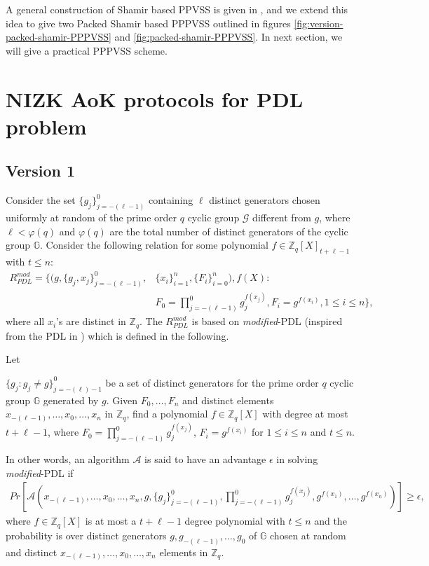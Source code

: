 A general construction of Shamir based PPVSS is given in \cite{cryptoeprint:2025/576}, and we extend this idea 
to give two Packed Shamir based PPPVSS outlined in figures \ref{fig:version-packed-shamir-PPPVSS} and \ref{fig:packed-shamir-PPPVSS}. 
In next section, we will give a practical PPPVSS scheme.




\section{NIZK AoK protocols for PDL problem}
\label{sec:aok_polynomial_dl}
\subsection{Version 1}
Consider the set $\{g_j\}_{j=-(\ell-1)}^0$ containing $\ell$ distinct generators chosen uniformly at random of 
the prime order $q$ cyclic group $\mathcal{G}$ different from $g$, where $\ell<\varphi(q)$ and $\varphi(q)$ are 
the total number of distinct generators of the cyclic group $\mathbb{G}$. Consider the following relation for 
some polynomial $f\in\mathbb{Z}_q[X]_{t+\ell-1}$ with $t\leq n$:
\begin{align}\label{eq:relation_mod_PDL}
  R_{PDL}^{mod} = \{(g,\{g_j,x_j\}_{j=-(\ell-1)}^0,&\{x_i\}_{i=1}^n,\{F_i\}_{i=0}^n),f(X) :\nonumber\\
   &F_0=\prod_{j=-(\ell-1)}^{0}g_j^{f(x_j)}, F_i=g^{f(x_i)}, 1\leq i\leq n\},
\end{align}
where all $x_i$'s are distinct in $\mathbb{Z}_q$. The $R_{PDL}^{mod}$ is based on \textit{modified}-PDL (inspired from the PDL in \cite{cryptoeprint:2023/1669}) 
which is defined in the following.

\begin{definition}
  Let\par 
  $\{g_j : g_j\neq g\}_{j=-(\ell)-1}^0$ be a set of distinct generators for the prime order $q$ cyclic 
  group $\mathbb{G}$ generated by $g$. Given $F_0,\dots,F_n$ and distinct elements $x_{-(\ell-1)},\dots,x_0,\dots,x_n$ in 
  $\mathbb{Z}_q$, find a polynomial $f\in\mathbb{Z}_q[X]$ with degree at most $t+\ell-1$, where $F_0=\prod_{j=-(\ell-1)}^{0}g_j^{f(x_j)}$, 
  $F_i=g^{f(x_i)}$ for $1\leq i\leq n$ and $t\leq n$.\par

  In other words, an algorithm $\mathcal{A}$ is said to have an advantage $\epsilon$ in solving \textit{modified}-PDL if 
  \begin{align*}
    Pr[\mathcal{A}(x_{-(\ell-1)},\dots,x_0,\dots,x_n,g,\{g_j\}_{j=-(\ell-1)}^0,\prod_{j=-(\ell-1)}^{0}g_j^{f(x_j)},g^{f(x_1)},\dots,g^{f(x_n)})]\geq\epsilon,
  \end{align*}
  where $f\in\mathbb{Z}_q[X]$ is at most a $t+\ell-1$ degree polynomial with $t\leq n$ and the probability is over 
  distinct generators $g,g_{-(\ell-1)},\dots,g_0$ of $\mathbb{G}$ chosen at random and distinct $x_{-(\ell-1)},\dots,x_0,\dots,x_n$ 
  elements in $\mathbb{Z}_q$.
\end{definition}

